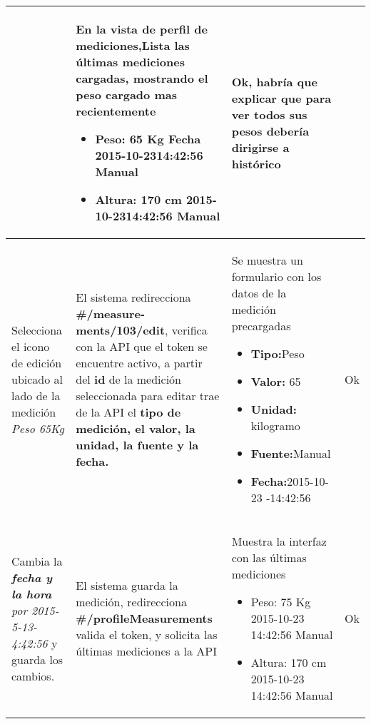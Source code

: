 {\begin{longtable}{|m{3.5cm}|m{3.5cm}|m{3.5cm}|m{2.5cm}|}
  				& En la vista de perfil de mediciones,Lista las últimas mediciones cargadas,
  				mostrando el peso cargado mas recientemente
  				
  				\begin{itemize}
  					\item Peso: 65 Kg Fecha 2015-10-2314:42:56 Manual
  					\item Altura: 170 cm 2015-10-2314:42:56 Manual
  					
  				\end{itemize}
  				& Ok, habría que explicar que para ver todos sus pesos debería dirigirse a histórico
  				
  				\\ \hline
  				
  				
  				
  				
  				
  				
  				Selecciona el icono de edición ubicado al lado de la medición \textit{Peso 65Kg}
  				& El sistema redirecciona \textbf{\#/measure-ments/103/edit}, verifica con la API que el token se encuentre activo, a partir del\textbf{ id} de la medición seleccionada para editar trae de la API el \textbf{tipo de medición, el valor, la unidad, la fuente y la fecha.}
  				
  				& Se muestra un formulario con los datos de la medición precargadas
  				\begin{itemize}
  					\item \textbf{Tipo:}Peso 
  					\item \textbf{Valor: }65 
  					\item \textbf{Unidad:} kilogramo
  					\item \textbf{Fuente:}Manual 
  					\item \textbf{Fecha:}2015-10-23 -14:42:56
  				\end{itemize}
  				&  Ok
  				\\ \hline
  				
  				
  				
  				
  				
  				Cambia la \textit{\textbf{fecha y la hora} por 2015-5-13- 4:42:56 }y guarda los cambios.
  				& El sistema guarda la medición, redirecciona\textbf{ \#/profileMeasurements }valida el token, y solicita las últimas mediciones a la API
  				
  				& Muestra la interfaz con las últimas mediciones 
  				\begin{itemize}
  					\item Peso: 75 Kg 2015-10-23 14:42:56 Manual 
  					\item Altura: 170 cm 2015-10-23 14:42:56 Manual
  				\end{itemize}
  				& Ok
  				\\ \hline
  				

\end{longtable}}
